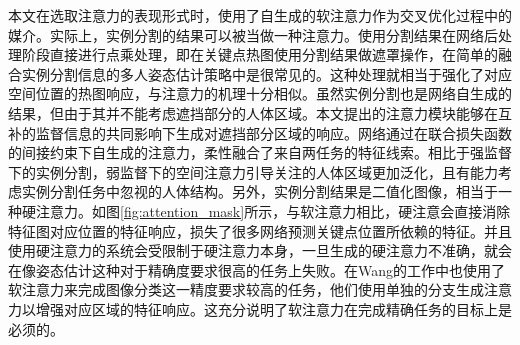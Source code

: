 本文在选取注意力的表现形式时，使用了自生成的软注意力作为交叉优化过程中的媒介。实际上，实例分割的结果可以被当做一种注意力。使用分割结果在网络后处理阶段直接进行点乘处理，即在关键点热图使用分割结果做遮罩操作，在简单的融合实例分割信息的多人姿态估计策略中是很常见的。这种处理就相当于强化了对应空间位置的热图响应，与注意力的机理十分相似。虽然实例分割也是网络自生成的结果，但由于其并不能考虑遮挡部分的人体区域。本文提出的注意力模块能够在互补的监督信息的共同影响下生成对遮挡部分区域的响应。网络通过在联合损失函数的间接约束下自生成的注意力，柔性融合了来自两任务的特征线索。相比于强监督下的实例分割，弱监督下的空间注意力引导关注的人体区域更加泛化，且有能力考虑实例分割任务中忽视的人体结构。另外，实例分割结果是二值化图像，相当于一种硬注意力。如图\ref{fig:attention_mask}所示，与软注意力相比，硬注意会直接消除特征图对应位置的特征响应，损失了很多网络预测关键点位置所依赖的特征。并且使用硬注意力的系统会受限制于硬注意力本身，一旦生成的硬注意力不准确，就会在像姿态估计这种对于精确度要求很高的任务上失败。在Wang的工作\cite{wang2017residual}中也使用了软注意力来完成图像分类这一精度要求较高的任务，他们使用单独的分支生成注意力以增强对应区域的特征响应。这充分说明了软注意力在完成精确任务的目标上是必须的。

